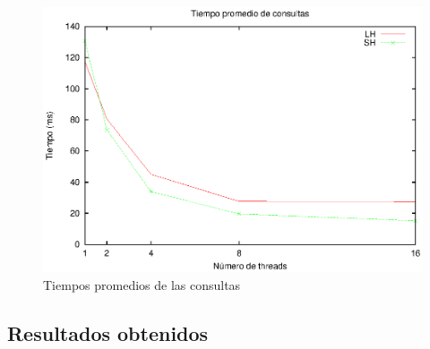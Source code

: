 \begin{figure}[!ht]
\centering
\includegraphics[scale=.75]{images/tiempos_wand.eps}
\caption{Tiempos promedios de las consultas}
\label{fig:tiempos_wand}
\end{figure}

\subsection{Resultados obtenidos}
\label{evaluacionexperimental:resultadosObtenidos}










